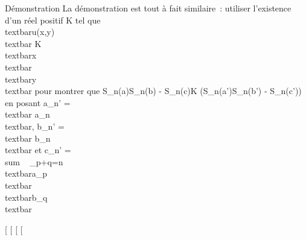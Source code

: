 \documentclass[]{article}
\begin{document}
Démonstration La démonstration est tout à fait similaire~: utiliser
l'existence d'un réel positif K tel que
\\textbar{}u(x,y)\\textbar{} \leq
K\\textbar{}x\\textbar{}
\\textbar{}y\\textbar{} pour montrer que
\left \textbar{}S\_n(a)S\_n(b) -
S\_n(c)\right \textbar{}\leq K\left
(S\_n(a')S\_n(b') -
S\_n(c')\right ) en posant a\_n'
=\\textbar{} a\_n\\textbar{},
b\_n' =\\textbar{}
b\_n\\textbar{} et c\_n'
= \\sum ~
\_p+q=n\\textbar{}a\_p\\textbar{}\\textbar{}b\_q\\textbar{}

{[}
{[}
{[}
{[}
\end{document}
